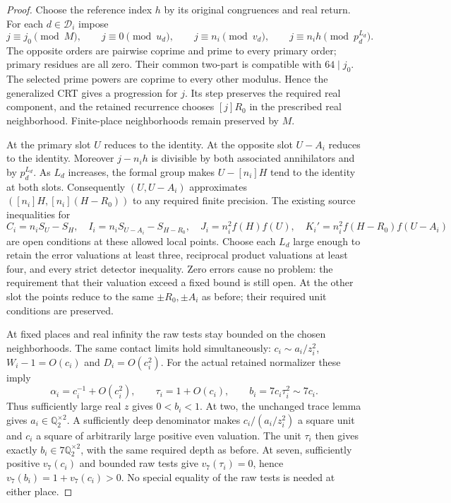\documentclass[11pt]{article}
\newcommand{\Q}{\mathbb Q}\newcommand{\Z}{\mathbb Z}
\begin{document}
\begin{proof}
Choose the reference index $h$ by its original congruences and real
return. For each $d\in\mathcal D_i$ impose
\[
 j\equiv j_0\pmod M,\qquad j\equiv0\pmod{u_d},\qquad
 j\equiv n_i\pmod{v_d},\qquad
 j\equiv n_i h\pmod{p_d^{L_d}}.
\]
The opposite orders are pairwise coprime and prime to every primary
order; primary residues are all zero. Their common two-part is
compatible with $64\mid j_0$. The selected prime powers are coprime
to every other modulus. Hence the generalized CRT gives a progression
for $j$. Its step preserves the required real component, and the
retained recurrence chooses $[j]R_0$ in the prescribed real neighborhood.
Finite-place neighborhoods remain preserved by $M$.

At the primary slot $U$ reduces to the identity. At the opposite
slot $U-A_i$ reduces to the identity. Moreover $j-n_i h$ is divisible
by both associated annihilators and by $p_d^{L_d}$. As $L_d$ increases,
the formal group makes $U-[n_i]H$ tend to the identity at both slots.
Consequently $(U,U-A_i)$ approximates
$([n_i]H,[n_i](H-R_0))$ to any required finite precision. The existing
source inequalities for
\[
 C_i=n_i S_U-S_H,\quad I_i=n_i S_{U-A_i}-S_{H-R_0},\quad
 J_i=n_i^2f(H)f(U),\quad K_i'=n_i^2f(H-R_0)f(U-A_i)
\]
are open conditions at these allowed local points. Choose each $L_d$
large enough to retain the error valuations at least three, reciprocal
product valuations at least four, and every strict detector inequality.
Zero errors cause no problem: the requirement that their valuation
exceed a fixed bound is still open. At the other slot the points reduce
to the same $\pm R_0,\pm A_i$ as before; their required unit conditions
are preserved.

At fixed places and real infinity the raw tests stay bounded on the
chosen neighborhoods. The same contact limits hold simultaneously:
$c_i\sim a_i/z_i^2$, $W_i-1=O(c_i)$ and $D_i=O(c_i^2)$.
For the actual retained normalizer these imply
\[
 \alpha_i=c_i^{-1}+O(c_i^2),\qquad
 \tau_i=1+O(c_i),\qquad b_i=7c_i\tau_i^2\sim7c_i.
\]
Thus sufficiently large real $z$ gives $0<b_i<1$. At two, the
unchanged trace lemma gives $a_i\in\Q_2^{\times2}$. A sufficiently
deep denominator makes $c_i/(a_i/z_i^2)$ a square unit and $c_i$
a square of arbitrarily large positive even valuation. The unit
$\tau_i$ then gives exactly $b_i\in7\Q_2^{\times2}$, with the
same required depth as before. At seven, sufficiently positive
$v_7(c_i)$ and bounded raw tests give $v_7(\tau_i)=0$, hence
$v_7(b_i)=1+v_7(c_i)>0$. No special equality of the raw tests is
needed at either place.


\end{proof}
\end{document}
